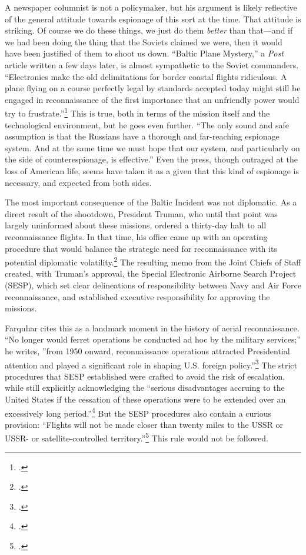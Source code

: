 \documentclass{report}
\begin{document}
\begin{refsegment}
A newspaper columnist is not a policymaker, but his argument is likely reflective of the general attitude towards espionage of this sort at the time. That attitude is striking. Of course we do these things, we just do them \emph{better} than that---and if we had been doing the thing that the Soviets claimed we were, then it would have been justified of them to shoot us down. ``Baltic Plane Mystery,'' a \emph{Post} article written a few days later, is almost sympathetic to the Soviet commanders. ``Electronics make the old delimitations for border coastal flights ridiculous. A plane flying on a course perfectly legal by standards accepted today might still be engaged in reconnaissance of the first importance that an unfriendly power would try to frustrate.''\footcite{childs_baltic_1950} This is true, both in terms of the mission itself and the technological environment, but he goes even further. ``The only sound and safe assumption is that the Russians have a thorough and far-reaching espionage system. And at the same time we must hope that our system, and particularly on the side of counterespionage, is effective.'' Even the press, though outraged at the loss of American life, seems have taken it as a given that this kind of espionage is necessary, and expected from both sides.

The most important consequence of the Baltic Incident was not diplomatic. As a direct result of the shootdown, President Truman, who until that point was largely uninformed about these missions, ordered a thirty-day halt to all reconnaissance flights. In that time, his office came up with an operating procedure that would balance the strategic need for reconnaissance with its potential diplomatic volatility.\footcite[p.~41]{farquhar_aerial_2015} The resulting memo from the Joint Chiefs of Staff created, with Truman's approval, the Special Electronic Airborne Search Project (SESP), which set clear delineations of responsibility between Navy and Air Force reconnaissance, and established executive responsibility for approving the missions.

Farquhar cites this as a landmark moment in the history of aerial reconnaissance. ``No longer would ferret operations be conducted ad hoc by the military services;'' he writes, ''from 1950 onward, reconnaissance operations attracted Presidential attention and played a significant role in shaping U.S. foreign policy.''\footcite[p.~42]{farquhar_aerial_2015} The strict procedures that SESP established were crafted to avoid the risk of escalation, while still explicitly acknowledging the ``serious disadvantages accruing to the United States if the cessation of these operations were to be extended over an excessively long period.''\footcite{bradley_memorandum_1950} But the SESP procedures also contain a curious provision: ``Flights will not be made closer than twenty miles to the USSR or USSR- or satellite-controlled territory.''\footcite{bradley_memorandum_1950} This rule would not be followed.


\end{refsegment}
\end{document}
